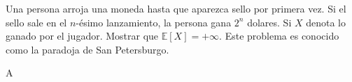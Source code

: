 \question
	Una persona arroja una moneda hasta que aparezca sello por primera vez. Si el sello sale en el $n$-ésimo lanzamiento, la persona gana $2^{n}$ dolares. Si $X$ denota lo ganado por el jugador. Mostrar que $\mathds{E}[X]= +\infty$. Este problema es conocido como la paradoja de San Petersburgo.


	\begin{solutionorbox}
		A
	\end{solutionorbox}